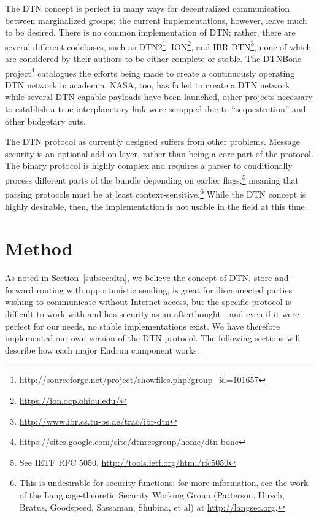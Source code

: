 \documentclass[12pt]{article}
\begin{document}
  The DTN concept is perfect in many ways for decentralized communication between marginalized groups; the current implementations, however, leave much to be desired. There is no common implementation of DTN; rather, there are several different codebases, such as DTN2\footnote{\url{http://sourceforge.net/project/showfiles.php?group_id=101657}}, ION\footnote{\url{https://ion.ocp.ohiou.edu/}}, and IBR-DTN\footnote{\url{http://www.ibr.cs.tu-bs.de/trac/ibr-dtn}}, none of which are considered by their authors to be either complete or stable. The DTNBone project\footnote{\url{https://sites.google.com/site/dtnresgroup/home/dtn-bone}} catalogues the efforts being made to create a continuously operating DTN network in academia. NASA, too, has failed to create a DTN network; while several DTN-capable payloads have been launched, other projects necessary to establish a true interplanetary link were scrapped due to ``sequestration'' and other budgetary cuts.
  
  The DTN protocol as currently designed suffers from other problems. Message security is an optional add-on layer, rather than being a core part of the protocol. The binary protocol is highly complex and requires a parser to conditionally process different parts of the bundle depending on earlier flags,\footnote{See IETF RFC 5050, \url{http://tools.ietf.org/html/rfc5050}} meaning that parsing protocols must be at least context-sensitive.\footnote{This is undesirable for security functions; for more information, see the work of the Language-theoretic Security Working Group (Patterson, Hirsch, Bratus, Goodspeed, Sassaman, Shubina, et al) at \url{http://langsec.org}.} While the DTN concept is highly desirable, then, the implementation is not usable in the field at this time.
  
  \section{Method}
  
  As noted in Section~\ref{subsec:dtn}, we believe the concept of DTN, store-and-forward routing with opportunistic sending, is great for disconnected parties wishing to communicate without Internet access, but the specific protocol is difficult to work with and has security as an afterthought---and even if it were perfect for our needs, no stable implementations exist. We have therefore implemented our own version of the DTN protocol. The following sections will describe how each major Endrun component works.
  
\end{document}
